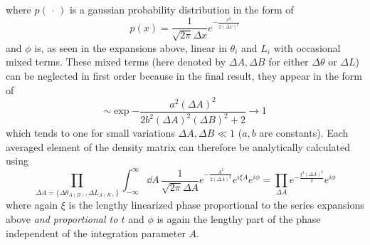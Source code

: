 where $p(\,\cdot\,)$ is a gaussian probability distribution in the form of
\begin{equation}
  p(x) = \frac{1}{\sqrt{2\pi}\Delta x} e^{-\frac{x^2}{2(\Delta x)^2}}
\end{equation}
and $\phi$ is, as seen in the expansions above, linear in $\theta_i$ and $L_i$ with occasional mixed terms.
These mixed terms (here denoted by $\Delta A,\Delta B$ for either $\Delta\theta$ or $\Delta L$) can be neglected in first order because in the final result, they appear in the form of
\begin{equation}
  \sim \exp{-\frac{a^2(\Delta A)^2}{2b^2(\Delta A)^2(\Delta B)^2 + 2}} \rightarrow 1
\end{equation}
which tends to one for small variations $\Delta A,\Delta B \ll 1$ ($a,b$ are constants).
Each averaged element of the density matrix can therefore be analytically calculated using 
\begin{equation} \label{eq:apx:average-density-element-calculation}
  \prod_{\Delta A = \{\Delta \theta_{A(B)}, \Delta L_{A(B)}\}} \int_{-\infty}^{\infty} \dd A \, \frac{1}{\sqrt{2\pi}\Delta A} e^{-\frac{A^2}{2 (\Delta A)^2}} e^{i\xi A} e^{i\phi} = \prod_{\Delta A} e^{-\frac{\xi^2 (\Delta A)^2}{2}} e^{i\phi}
\end{equation}
where again $\xi$ is the lengthy linearized phase proportional to the series expansions above \textit{and proportional to $t$} and $\phi$ is again the lengthy part of the phase independent of the integration parameter $A$.

